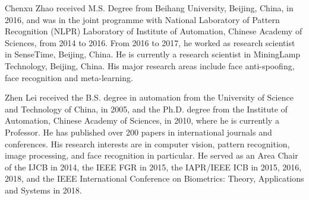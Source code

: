 \documentclass[10pt,journal,compsoc]{IEEEtran}
\begin{document}
	
	
	\begin{IEEEbiography}{Chenxu Zhao}
		received M.S. Degree from Beihang University, Beijing, China, in 2016, and was in the joint programme with National Laboratory of Pattern Recognition (NLPR) Laboratory of Institute of Automation, Chinese Academy of Sciences, from 2014 to 2016.
		From 2016 to 2017, he worked as research scientist in SenseTime, Beijing, China. 
		He is currently a research scientist in MiningLamp Technology, Beijing, China. 
		His major research areas include face anti-spoofing, face recognition and meta-learning.
	\end{IEEEbiography}
	
	
	
	\begin{IEEEbiography}{Zhen Lei}
		received the B.S. degree in automation from the University of Science and Technology of China, in 2005, and the Ph.D. degree from the Institute of Automation, Chinese Academy of Sciences, in 2010, where he is currently a Professor. He has published over 200 papers in international journals and conferences. His research interests are in computer vision, pattern recognition, image processing, and face recognition in particular. He served as an Area Chair of the IJCB in 2014, the IEEE FGR in 2015, the IAPR/IEEE ICB in 2015, 2016, 2018, and the IEEE International Conference on Biometrics: Theory, Applications and Systems in 2018.  
	\end{IEEEbiography}
	
\end{document}
